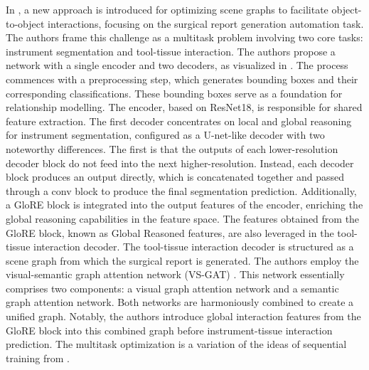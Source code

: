 In \citet{seenivasan2022global}, a new approach is introduced for optimizing scene graphs to facilitate object-to-object interactions, focusing on the surgical report generation automation task. The authors frame this challenge as a multitask problem involving two core tasks: instrument segmentation and tool-tissue interaction. The authors propose a network with a single encoder and two decoders, as visualized in .
The process commences with a preprocessing step, which generates bounding boxes and their corresponding classifications. These bounding boxes serve as a foundation for relationship modelling. The encoder, based on ResNet18, is responsible for shared feature extraction.
The first decoder concentrates on local and global reasoning for instrument segmentation, configured as a U-net-like decoder with two noteworthy differences. The first is that the outputs of each lower-resolution decoder block do not feed into the next higher-resolution. Instead, each decoder block produces an output directly, which is concatenated together and passed through a conv block to produce the final segmentation prediction.  Additionally, a GloRE block \citep{Chen_2019_CVPR} is integrated into the output features of the encoder, enriching the global reasoning capabilities in the feature space. The features obtained from the GloRE block, known as Global Reasoned features, are also leveraged in the tool-tissue interaction decoder.
The tool-tissue interaction decoder is structured as a scene graph from which the surgical report is generated. The authors employ the visual-semantic graph attention network (VS-GAT) \citep{9739429}. This network essentially comprises two components: a visual graph attention network and a semantic graph attention network. Both networks are harmoniously combined to create a unified graph. Notably, the authors introduce global interaction features from the GloRE block into this combined graph before instrument-tissue interaction prediction. The multitask optimization is a variation of the ideas of sequential training from \citet{learning_look_tracking}. 

